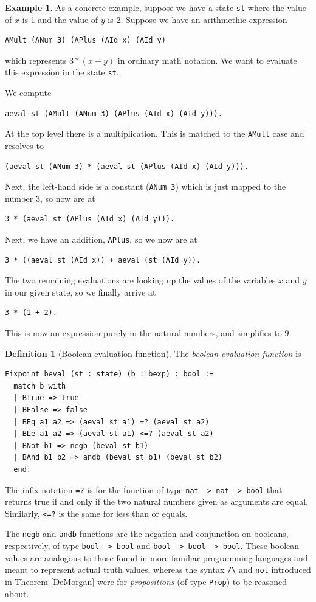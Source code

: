 \documentclass[12pt,notitlepage]{report}
\theoremstyle{plain}
\theoremstyle{definition}
\newtheorem{defin}[theo]{Definition}
\newtheorem{example}[theo]{Example}
\newcommand{\define}[1]{\emph{#1}\index{#1}}
\numberwithin{equation}{section}
\begin{document}
\begin{example}
As a concrete example, suppose we have a state \texttt{st} where the value of $x$ is 1 and the value of $y$ is 2.  Suppose we have an arithmethic expression 
\begin{verbatim}
AMult (ANum 3) (APlus (AId x) (AId y)
\end{verbatim}
which represents $3 * (x + y)$ in ordinary math notation.  We want to evaluate this expression in the state \texttt{st}.  \par We compute 
\begin{verbatim}
aeval st (AMult (ANum 3) (APlus (AId x) (AId y))).
\end{verbatim}
At the top level there is a multiplication.  This is matched to the \texttt{AMult} case and resolves to 
\begin{verbatim}
(aeval st (ANum 3) * (aeval st (APlus (AId x) (AId y))).  
\end{verbatim}
\par Next, the left-hand side is a constant (\texttt{ANum 3}) which is just mapped to the number 3, so now are at 
\begin{verbatim}
3 * (aeval st (APlus (AId x) (AId y))).
\end{verbatim}
\par Next, we have an addition, \texttt{APlus}, so we now are at 
\begin{verbatim}
3 * ((aeval st (AId x)) + aeval (st (AId y)).
\end{verbatim}
The two remaining evaluations are looking up the values of the variables $x$ and $y$ in our given state, so we finally arrive at 
\begin{verbatim}
3 * (1 + 2). 
\end{verbatim}
This is now an expression purely in the natural numbers, and simplifies to $9$.
\end{example}

\begin{defin}[Boolean evaluation function]
The \define{boolean evaluation function} is
\begin{verbatim}
Fixpoint beval (st : state) (b : bexp) : bool :=
  match b with
  | BTrue => true
  | BFalse => false
  | BEq a1 a2 => (aeval st a1) =? (aeval st a2)
  | BLe a1 a2 => (aeval st a1) <=? (aeval st a2)
  | BNot b1 => negb (beval st b1)
  | BAnd b1 b2 => andb (beval st b1) (beval st b2)
  end.
\end{verbatim}
The infix notation \texttt{=?} is for the function of type \texttt{nat -> nat -> bool} that returns true if and only if the two natural numbers given as arguments are equal.  Similarly, \texttt{<=?} is the same for less than or equals.
\par The \texttt{negb} and \texttt{andb} functions are the negation and conjunction on booleans, respectively, of type \texttt{bool -> bool} and \texttt{bool -> bool -> bool}.  These boolean values are analogous to those found in more familiar programming languages and meant to represent actual truth values, whereas the syntax \verb$/\$ and \texttt{not} introduced in Theorem \ref{DeMorgan} were for \emph{propositions} (of type \texttt{Prop}) to be reasoned about.
\end{defin}
\end{document}
